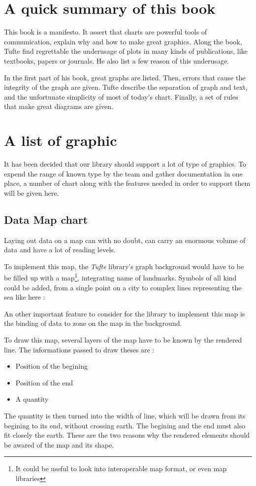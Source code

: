 \section{A quick summary of this book}
This book is a manifesto. It assert that charts are powerful tools of communication, explain why and how to make great graphics.
Along the book, Tufte find regrettable the underusage of plots in many kinds of publications, like textbooks, papers or journals. He also list a few reason of this underusage.

In the first part of his book, great graphs are listed. Then, errors that cause the integrity of the graph are given. Tufte describe the separation of graph and text, and the unfortunate simplicity of most of today's chart.
Finally, a set of rules that make great diagrams are given.




\section{A list of graphic}
It has been decided that our library should support a lot of type of graphics. To expend the range of known type by the team and gather documentation in one place, a number of chart along with the features needed in order to support them will be given here.

\subsection{Data Map chart}
Laying out data on a map can with no doubt, can carry an enormous volume of data and have a lot of reading levels.

To implement this map, the \textit{Tufte} library's graph background would have to be be filled up with a map\footnote{It could be useful to look into interoperable map format, or even map libraries}, integrating name of landmarks. Symbols of all kind could be added, from a single point on a city to complex lines representing the sea like here :

An other important feature to consider for the library to implement this map is the binding of data to zone on the map in the background.

To draw this map, several layers of the map have to be known by the rendered line. The informations passed to draw theses are :
\begin{itemize}
\item Position of the begining
\item Position of the end
\item A quantity
\end{itemize}
The quantity is then turned into the width of line, which will be drawn from its begining to its end, without crossing earth.
The begining and the end must also fit closely the earth. These are the two reasons why the rendered elements should be awared of the map and its shape.

